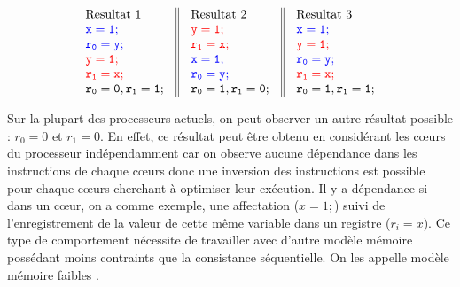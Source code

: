 \documentclass[12pt,a4paper]{article}
\begin{document}
\[
\begin{array}{c||c||c}
  \begin{array}{l}
    \text{Resultat 1} \\
    \textcolor[rgb]{0,0,1}{\mathtt{x = 1;}} \\
    \textcolor[rgb]{0,0,1}{\mathtt{r_0 = y;}} \\
    \textcolor[rgb]{1,0,0}{\mathtt{y = 1;}} \\
    \textcolor[rgb]{1,0,0}{\mathtt{r_1 = x;}} \\
    \mathtt{r_0 = 0, r_1 = 1;} \\
  \end{array} &
  \begin{array}{l}
    \text{Resultat 2} \\
    \textcolor[rgb]{1,0,0}{\mathtt{y = 1;}} \\
    \textcolor[rgb]{1,0,0}{\mathtt{r_1 = x;}} \\
    \textcolor[rgb]{0,0,1}{\mathtt{x = 1;}} \\
    \textcolor[rgb]{0,0,1}{\mathtt{r_0 = y;}} \\
    \mathtt{r_0 = 1, r_1 = 0;} \\
  \end{array} &
    \begin{array}{l}
    \text{Resultat 3} \\
    \textcolor[rgb]{0,0,1}{\mathtt{x = 1;}} \\
    \textcolor[rgb]{1,0,0}{\mathtt{y = 1;}} \\
    \textcolor[rgb]{0,0,1}{\mathtt{r_0 = y;}} \\
    \textcolor[rgb]{1,0,0}{\mathtt{r_1 = x;}} \\
    \mathtt{r_0 = 1, r_1 = 1;} \\
  \end{array} 
\end{array}
\]

Sur la plupart des processeurs actuels, on peut observer un autre résultat possible : $r_0 = 0$ et $r_1 = 0$. En effet, ce résultat peut être obtenu en considérant les cœurs du processeur indépendamment car on observe aucune dépendance dans les instructions de chaque cœurs donc une inversion des instructions est possible pour chaque cœurs cherchant à optimiser leur exécution. Il y a dépendance si dans un cœur, on a comme exemple, une affectation ($x = 1;$) suivi de l'enregistrement de la valeur de cette même variable dans un registre ($r_i = x$). Ce type de comportement nécessite de travailler avec d'autre modèle mémoire possédant moins contraints que la consistance séquentielle. On les appelle modèle mémoire faibles \cite{Adve:1996:SMC:619013.620590}. 
\end{document}
